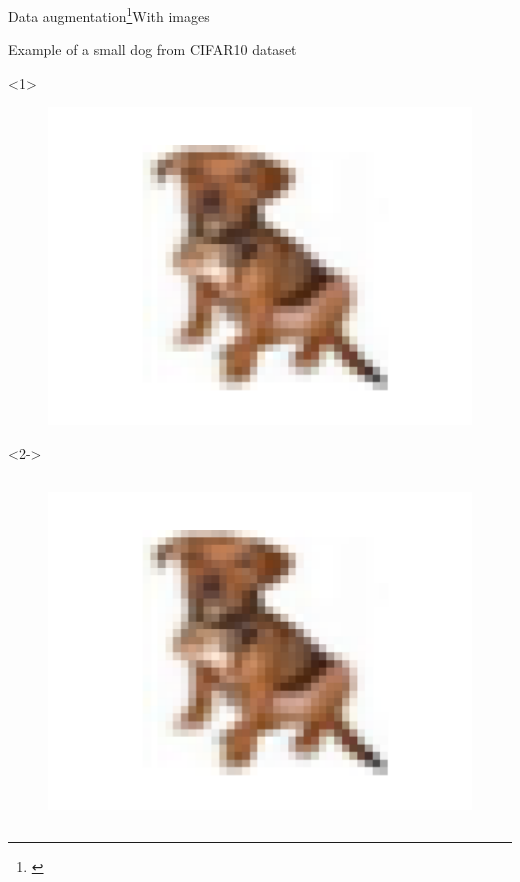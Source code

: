 \documentclass[10pt,aspectratio=43]{beamer}
\begin{document}
\begin{frame}{Data augmentation\footnote[frame]{\citet{chollet2018deep}}}{With images}
    \begin{center}
        Example of a small dog from CIFAR10 dataset
    \end{center}
    \begin{onlyenv}<1>
        \begin{figure}
            \centering
            \includegraphics[scale=.6]{dog_cifar.pdf}
        \end{figure}
    \end{onlyenv}
    \begin{onlyenv}<2->
        \centering
    \begin{columns}[t]
        \column{.5\paperwidth}
        \begin{figure}
        \centering
        \includegraphics[scale=.4]{dog_cifar.pdf}

\end{figure}
\end{columns}
\end{onlyenv}
\end{frame}
\end{document}
